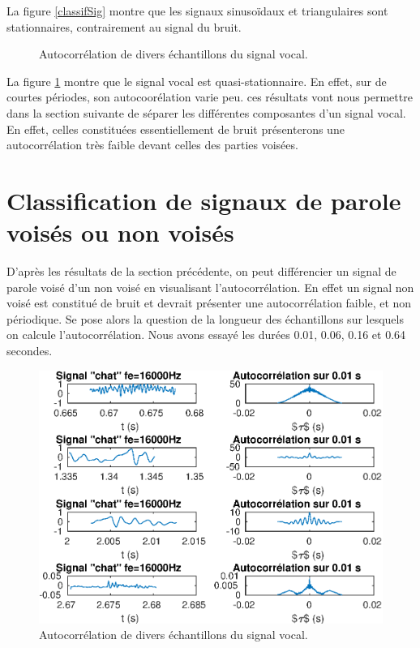 \documentclass[french]{article}
\begin{document}
La figure \ref{classifSig} montre que les signaux sinusoïdaux et triangulaires sont stationnaires, contrairement au signal du bruit.

\begin{figure}[h!]
\centering

\caption{Autocorrélation de divers échantillons du signal vocal.}
\label{classifAh}
\end{figure}

La figure \ref{classifAh} montre que le signal vocal est quasi-stationnaire. En effet, sur de courtes périodes, son autocoorélation varie peu. ces résultats vont nous permettre dans la section suivante de séparer les différentes composantes d'un signal vocal. En effet, celles constituées essentiellement de bruit présenterons une autocorrélation très faible devant celles des parties voisées.

\FloatBarrier

\section{ Classification de signaux de parole voisés ou non voisés}

\label{sect:autocorr_voise}

D'après les résultats de la section précédente, on peut différencier un signal de parole voisé d'un non voisé en visualisant l'autocorrélation. En effet un signal non voisé est constitué de bruit et devrait présenter une autocorrélation faible, et non périodique. Se pose alors la question de la longueur des échantillons sur lesquels on calcule l'autocorrélation. Nous avons essayé les durées 0.01, 0.06, 0.16 et 0.64 secondes.

\begin{figure}[h!]
\centering
\includegraphics[height=0.45\textheight]{images/classificationVoix1.eps}
\caption{Autocorrélation de divers échantillons du signal vocal.}
\label{classif1}
\end{figure}
\end{document}
